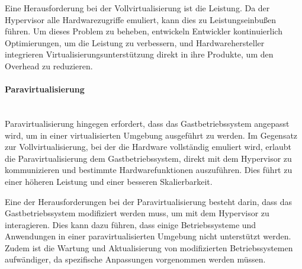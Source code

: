 Eine Herausforderung bei der Vollvirtualisierung ist die Leistung. Da der Hypervisor alle Hardwarezugriffe emuliert, kann dies zu Leistungseinbußen führen. Um dieses Problem zu beheben, entwickeln Entwickler kontinuierlich Optimierungen, um die Leistung zu verbessern, und Hardwarehersteller integrieren Virtualisierungsunterstützung direkt in ihre Produkte, um den Overhead zu reduzieren.
\paragraph{Paravirtualisierung\\\\}
Paravirtualisierung hingegen erfordert, dass das Gastbetriebssystem angepasst wird, um in einer virtualisierten Umgebung ausgeführt zu werden. Im Gegensatz zur Vollvirtualisierung, bei der die Hardware vollständig emuliert wird, erlaubt die Paravirtualisierung dem Gastbetriebssystem, direkt mit dem Hypervisor zu kommunizieren und bestimmte Hardwarefunktionen auszuführen. Dies führt zu einer höheren Leistung und einer besseren Skalierbarkeit.

Eine der Herausforderungen bei der Paravirtualisierung besteht darin, dass das Gastbetriebssystem modifiziert werden muss, um mit dem Hypervisor zu interagieren. Dies kann dazu führen, dass einige Betriebssysteme und Anwendungen in einer paravirtualisierten Umgebung nicht unterstützt werden. Zudem ist die Wartung und Aktualisierung von modifizierten Betriebssystemen aufwändiger, da spezifische Anpassungen vorgenommen werden müssen.
